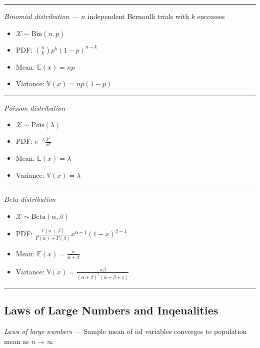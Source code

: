 {\color{lightgray}\hrule height 0.001mm}

\emph{Binomial distribution} --- $n$ independent Bernoulli trials with $k$ successes
\begin{multicols}{2}
\begin{itemize}
    \item $\mathcal{X} \sim \textrm{Bin}(n,p)$
    \item PDF: $\binom{n}{k} p^k (1-p)^{n-k}$
    \item Mean: $\mathbb{E}(x) = np$
    \item Variance: $\mathbb{V}(x) = np(1-p)$
\end{itemize}
\end{multicols}

{\color{lightgray}\hrule height 0.001mm}

\emph{Poisson distribution} ---
\begin{multicols}{2}
\begin{itemize}
    \item $\mathcal{X} \sim \textrm{Pois}(\lambda)$
    \item PDF: $e^{-\lambda} \frac{\lambda^x}{x!}$
    \item Mean: $\mathbb{E}(x) = \lambda$
    \item Variance: $\mathbb{V}(x) = \lambda$
\end{itemize}
\end{multicols}

{\color{lightgray}\hrule height 0.001mm}

\emph{Beta distribution} ---
\begin{multicols}{2}
\begin{itemize}
    \item $\mathcal{X} \sim \textrm{Beta}(\alpha,\beta)$
    \item PDF: $\frac{\Gamma(\alpha+\beta)}{\Gamma(\alpha)+\Gamma(\beta)} x^{\alpha-1} (1-x)^{\beta-1}$
    \item Mean: $\mathbb{E}(x) = \frac{\alpha}{\alpha+\beta}$
    \item Variance: $\mathbb{V}(x) = \frac{\alpha\beta}{(\alpha+\beta)^2(\alpha+\beta+1)}$
\end{itemize}
\end{multicols}

{\color{black}\hrule height 0.001mm}

\subsection*{Laws of Large Numbers and Inqeualities}
\emph{Laws of large numbers} --- Sample mean of iid variables converges to population mean as $n \rightarrow \infty$

